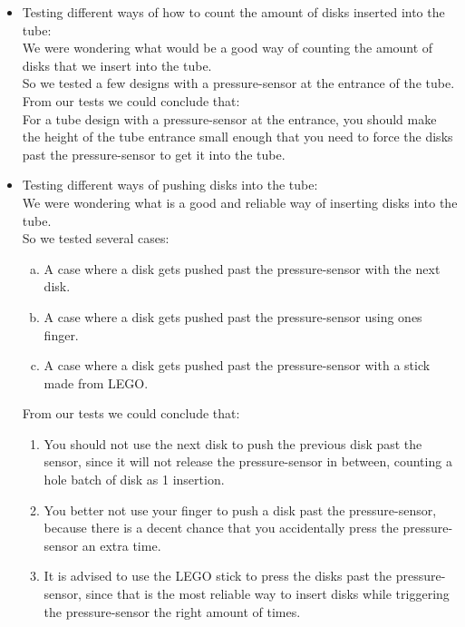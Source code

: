 \begin{itemize}
\item{Testing different ways of how to count the amount of disks inserted into the tube:\\%
We were wondering what would be a good way of counting the amount of disks that we insert into the tube.\\
So we tested a few designs with a pressure-sensor at the entrance of the tube.\\
From our tests we could conclude that:\\
For a tube design with a pressure-sensor at the entrance, you should make the height of the tube entrance small enough that you need to force the disks past the pressure-sensor to get it into the tube.}\\


\item {Testing different ways of pushing disks into the tube:\\
We were wondering what is a good and reliable way of inserting disks into the tube.\\
So we tested several cases:
\begin{enumerate}[a.]
\item{A case where a disk gets pushed past the pressure-sensor with the next disk.}
\item{A case where a disk gets pushed past the pressure-sensor using ones finger.}
\item{A case where a disk gets pushed past the pressure-sensor with a stick made from LEGO.}
\end{enumerate}
From our tests we could conclude that:
\begin{enumerate}
\item{You should not use the next disk to push the previous disk past the sensor, since it will not release the pressure-sensor in between, counting a hole batch of disk as 1 insertion.}
\item{You better not use your finger to push a disk past the pressure-sensor, because there is a decent chance that you accidentally press the pressure-sensor an extra time.}
\item{It is advised to use the LEGO stick to press the disks past the pressure-sensor, since that is the most reliable way to insert disks while triggering the pressure-sensor the right amount of times.}\\
\end{enumerate}}



\end{itemize}
